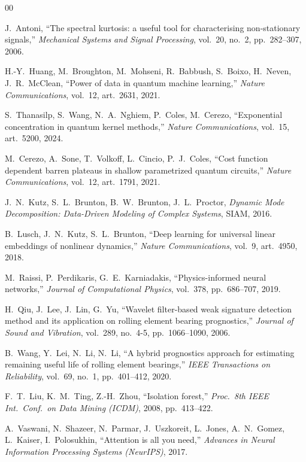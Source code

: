 \documentclass[3p,times,procedia]{elsarticle}
\begin{document}
\begin{thebibliography}{00}

J.~Antoni, ``The spectral kurtosis: a useful tool for characterising non-stationary signals,'' \textit{Mechanical Systems and Signal Processing}, vol.~20, no.~2, pp.~282--307, 2006.

H.-Y.~Huang, M.~Broughton, M.~Mohseni, R.~Babbush, S.~Boixo, H.~Neven, J.~R.~McClean, ``Power of data in quantum machine learning,'' \textit{Nature Communications}, vol.~12, art.~2631, 2021.

S.~Thanasilp, S.~Wang, N.~A.~Nghiem, P.~Coles, M.~Cerezo, ``Exponential concentration in quantum kernel methods,'' \textit{Nature Communications}, vol.~15, art.~5200, 2024.

M.~Cerezo, A.~Sone, T.~Volkoff, L.~Cincio, P.~J.~Coles, ``Cost function dependent barren plateaus in shallow parametrized quantum circuits,'' \textit{Nature Communications}, vol.~12, art.~1791, 2021.

J.~N.~Kutz, S.~L.~Brunton, B.~W.~Brunton, J.~L.~Proctor, \textit{Dynamic Mode Decomposition: Data-Driven Modeling of Complex Systems}, SIAM, 2016.

B.~Lusch, J.~N.~Kutz, S.~L.~Brunton, ``Deep learning for universal linear embeddings of nonlinear dynamics,'' \textit{Nature Communications}, vol.~9, art.~4950, 2018.

M.~Raissi, P.~Perdikaris, G.~E.~Karniadakis, ``Physics-informed neural networks,'' \textit{Journal of Computational Physics}, vol.~378, pp.~686--707, 2019.

H.~Qiu, J.~Lee, J.~Lin, G.~Yu, ``Wavelet filter-based weak signature detection method and its application on rolling element bearing prognostics,'' \textit{Journal of Sound and Vibration}, vol.~289, no.~4-5, pp.~1066--1090, 2006.

B.~Wang, Y.~Lei, N.~Li, N.~Li, ``A hybrid prognostics approach for estimating remaining useful life of rolling element bearings,'' \textit{IEEE Transactions on Reliability}, vol.~69, no.~1, pp.~401--412, 2020.

F.~T.~Liu, K.~M.~Ting, Z.-H.~Zhou, ``Isolation forest,'' \textit{Proc.\ 8th IEEE Int.\ Conf.\ on Data Mining (ICDM)}, 2008, pp.~413--422.

A.~Vaswani, N.~Shazeer, N.~Parmar, J.~Uszkoreit, L.~Jones, A.~N.~Gomez, L.~Kaiser, I.~Polosukhin, ``Attention is all you need,'' \textit{Advances in Neural Information Processing Systems (NeurIPS)}, 2017.


\end{thebibliography}
\end{document}
